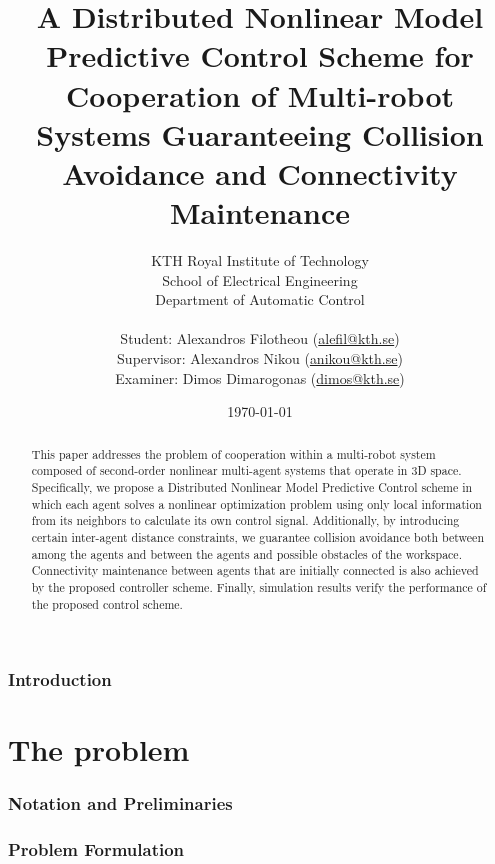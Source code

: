 \documentclass[a4paper,12pt,twoside]{article}
\title{\textbf{A Distributed Nonlinear Model Predictive Control Scheme for
Cooperation of Multi-robot Systems Guaranteeing Collision Avoidance and
Connectivity Maintenance}}
\author{KTH Royal Institute of Technology \\
  School of Electrical Engineering \\
  Department of Automatic Control \\ \\
Student: Alexandros Filotheou (\href{mailto: alefil@kth.se}{alefil@kth.se}) \\
Supervisor: Alexandros Nikou (\href{mailto: anikou@kth.se}{anikou@kth.se}) \\
Examiner: Dimos Dimarogonas (\href{mailto: dimos@kth.se}{dimos@kth.se}) \\}
\date{\today}
\begin{document}
\maketitle

\begin{abstract}
	This paper addresses the problem of cooperation within a multi-robot
  system composed of second-order nonlinear multi-agent systems that operate
  in $3$D space. Specifically, we propose a Distributed Nonlinear Model
  Predictive Control scheme in which each agent solves a nonlinear optimization
  problem using only local information from its neighbors to calculate its own
  control signal. Additionally, by introducing certain
  inter-agent distance constraints, we guarantee collision avoidance both
  between among the agents and between the agents and possible obstacles of the
  workspace. Connectivity maintenance between agents that are initially
  connected is also achieved by the proposed controller scheme. Finally,
  simulation results verify the  performance of the proposed control scheme.
\end{abstract}

\cleardoublepage
\tableofcontents
\cleardoublepage


\section{Introduction}

  
  \cleardoublepage

\part{The problem}
\cleardoublepage

  \section{Notation and Preliminaries}
    \label{sec:notation_reliminaries}

    
    
    
    \cleardoublepage


  \section{Problem Formulation}
    \label{sec:prob_formulation}
\end{document}
